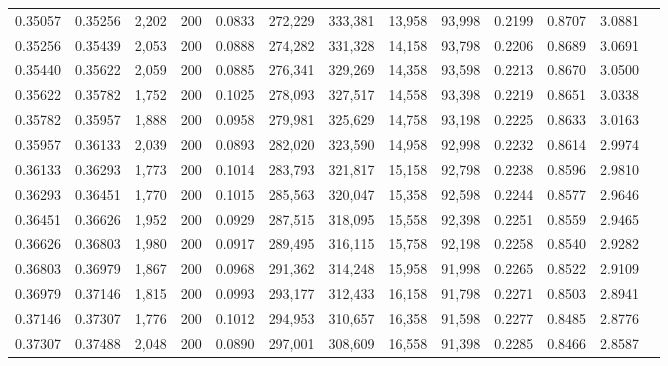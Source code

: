 \begin{tabular}{rrrrrrrrrrrrr}
0.35057 & 0.35256 &  2,202 & 200 &                                     0.0833 & 272,229 & 333,381 &  13,958 &  93,998 & 0.2199 & 0.8707 & 3.0881 \\
0.35256 & 0.35439 &  2,053 & 200 &                                     0.0888 & 274,282 & 331,328 &  14,158 &  93,798 & 0.2206 & 0.8689 & 3.0691 \\
0.35440 & 0.35622 &  2,059 & 200 &                                     0.0885 & 276,341 & 329,269 &  14,358 &  93,598 & 0.2213 & 0.8670 & 3.0500 \\
0.35622 & 0.35782 &  1,752 & 200 &                                     0.1025 & 278,093 & 327,517 &  14,558 &  93,398 & 0.2219 & 0.8651 & 3.0338 \\
0.35782 & 0.35957 &  1,888 & 200 &                                     0.0958 & 279,981 & 325,629 &  14,758 &  93,198 & 0.2225 & 0.8633 & 3.0163 \\
0.35957 & 0.36133 &  2,039 & 200 &                                     0.0893 & 282,020 & 323,590 &  14,958 &  92,998 & 0.2232 & 0.8614 & 2.9974 \\
0.36133 & 0.36293 &  1,773 & 200 &                                     0.1014 & 283,793 & 321,817 &  15,158 &  92,798 & 0.2238 & 0.8596 & 2.9810 \\
0.36293 & 0.36451 &  1,770 & 200 &                                     0.1015 & 285,563 & 320,047 &  15,358 &  92,598 & 0.2244 & 0.8577 & 2.9646 \\
0.36451 & 0.36626 &  1,952 & 200 &                                     0.0929 & 287,515 & 318,095 &  15,558 &  92,398 & 0.2251 & 0.8559 & 2.9465 \\
0.36626 & 0.36803 &  1,980 & 200 &                                     0.0917 & 289,495 & 316,115 &  15,758 &  92,198 & 0.2258 & 0.8540 & 2.9282 \\
0.36803 & 0.36979 &  1,867 & 200 &                                     0.0968 & 291,362 & 314,248 &  15,958 &  91,998 & 0.2265 & 0.8522 & 2.9109 \\
0.36979 & 0.37146 &  1,815 & 200 &                                     0.0993 & 293,177 & 312,433 &  16,158 &  91,798 & 0.2271 & 0.8503 & 2.8941 \\
0.37146 & 0.37307 &  1,776 & 200 &                                     0.1012 & 294,953 & 310,657 &  16,358 &  91,598 & 0.2277 & 0.8485 & 2.8776 \\
0.37307 & 0.37488 &  2,048 & 200 &                                     0.0890 & 297,001 & 308,609 &  16,558 &  91,398 & 0.2285 & 0.8466 & 2.8587 \\

\end{tabular}
